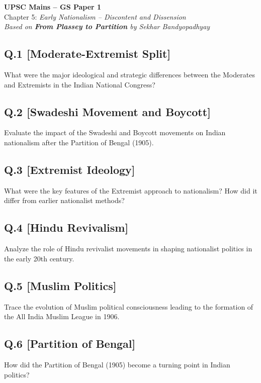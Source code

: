 \begin{center}
    \Large\textbf{UPSC Mains – GS Paper 1}\\
    \normalsize Chapter 5: \textit{Early Nationalism – Discontent and Dissension}\\
    \vspace{0.5em}
    \textit{Based on \textbf{From Plassey to Partition} by Sekhar Bandyopadhyay}
\end{center}

\vspace{1em}

\subsection*{Q.1 [Moderate-Extremist Split]}
What were the major ideological and strategic differences between the Moderates and Extremists in the Indian National Congress?

\subsection*{Q.2 [Swadeshi Movement and Boycott]}
Evaluate the impact of the Swadeshi and Boycott movements on Indian nationalism after the Partition of Bengal (1905).

\subsection*{Q.3 [Extremist Ideology]}
What were the key features of the Extremist approach to nationalism? How did it differ from earlier nationalist methods?

\subsection*{Q.4 [Hindu Revivalism]}
Analyze the role of Hindu revivalist movements in shaping nationalist politics in the early 20th century.

\subsection*{Q.5 [Muslim Politics]}
Trace the evolution of Muslim political consciousness leading to the formation of the All India Muslim League in 1906.

\subsection*{Q.6 [Partition of Bengal]}
How did the Partition of Bengal (1905) become a turning point in Indian politics?

